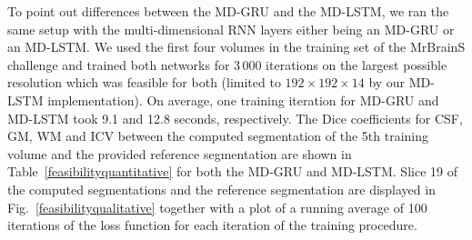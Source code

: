 \documentclass[runningheads,a4paper]{llncs}
\begin{document}
To point out differences between the MD-GRU and the MD-LSTM, we ran the same setup with the multi-dimensional RNN layers either being an MD-GRU or an MD-LSTM. We used the first four volumes in the training set of the MrBrainS challenge and trained both networks for 3\,000 iterations on the largest possible resolution which was feasible for both (limited to $192\times192\times14$ by our MD-LSTM implementation). On average, one training iteration for MD-GRU and MD-LSTM took 9.1 and 12.8 seconds, respectively. The Dice coefficients for CSF, GM, WM and ICV between the computed segmentation of the 5th training volume and the provided reference segmentation are shown in Table~\ref{feasibilityquantitative} for both the MD-GRU and MD-LSTM. Slice 19 of the computed segmentations and the reference segmentation are displayed in Fig.~\ref{feasibilityqualitative} together with a plot of a running average of 100 iterations of the loss function for each iteration of the training procedure.
\end{document}

